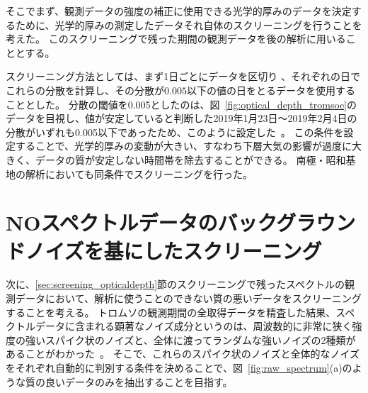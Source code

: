 そこでまず、観測データの強度の補正に使用できる光学的厚みのデータを決定するために、光学的厚みの測定したデータそれ自体のスクリーニングを行うことを考えた。
このスクリーニングで残った期間の観測データを後の解析に用いることとする。\par

スクリーニング方法としては、まず1日ごとにデータを区切り
、それぞれの日でこれらの分散を計算し、その分散が$0.005$以下の値の日をとるデータを使用することとした。
分散の閾値を0.005としたのは、図~\ref{fig:optical_depth_tromsoe}のデータを目視し、値が安定していると判断した2019年1月23日〜2019年2月4日の分散がいずれも0.005以下であったため、このように設定した~\cite{goto2021bachelor}。
この条件を設定することで、光学的厚みの変動が大きい、すなわち下層大気の影響が過度に大きく、データの質が安定しない時間帯を除去することができる。
南極・昭和基地の解析においても同条件でスクリーニングを行った。


\section{NOスペクトルデータのバックグラウンドノイズを基にしたスクリーニング}
\label{sec:screening_spectralnoise}
次に、\ref{sec:screening_opticaldepth}節のスクリーニングで残ったスペクトルの観測データにおいて、解析に使うことのできない質の悪いデータをスクリーニングすることを考える。
トロムソの観測期間の全取得データを精査した結果、スペクトルデータに含まれる顕著なノイズ成分というのは、周波数的に非常に狭く強度の強いスパイク状のノイズと、全体に渡ってランダムな強いノイズの2種類があることがわかった~\cite{goto2021bachelor}。
そこで、これらのスパイク状のノイズと全体的なノイズをそれぞれ自動的に判別する条件を決めることで、図~\ref{fig:raw_spectrum}(a)のような質の良いデータのみを抽出することを目指す。\par

